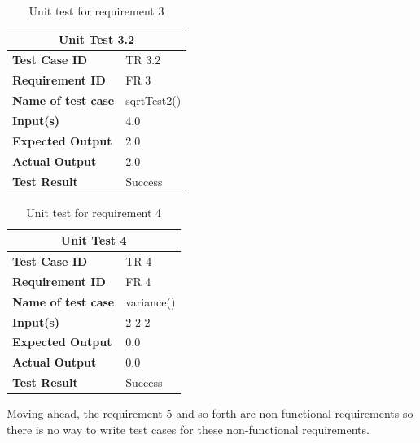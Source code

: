 \documentclass{scrartcl}
\begin{document}
\begin{table}[H]
\begin{Large}
\begin{center}
\begin{tabular}{ | m{10em} | m{10em} | } 
  \hline
  \multicolumn{2}{|c|}{\textbf {Unit Test 3.2}} \\ 
  \hline
  \textbf{Test Case ID}  &  TR 3.2\\ 
  \hline
  \textbf{Requirement ID} &  FR 3\\
  \hline
  \textbf{Name of test case} & sqrtTest2()\\
  \hline
  \textbf{Input(s) } &  4.0 \\
  \hline
  \textbf{Expected Output } & 2.0\\
  \hline
  \textbf{Actual Output } & 2.0\\
  \hline
  \textbf{Test Result } & Success \\
 \hline
\end{tabular}
\caption{Unit test for requirement 3}
\label{table:unit test 3.2}
\end{center}
\end{Large}
\end{table}

\begin{table}[H]
\begin{Large}
\begin{center}
\begin{tabular}{ | m{10em} | m{10em} | } 
  \hline
  \multicolumn{2}{|c|}{\textbf {Unit Test 4}} \\ 
  \hline
  \textbf{Test Case ID}  &  TR 4\\ 
  \hline
  \textbf{Requirement ID} &  FR 4\\
  \hline
  \textbf{Name of test case} & variance()\\
  \hline
  \textbf{Input(s) } &  2 2 2\\
  \hline
  \textbf{Expected Output } & 0.0\\
  \hline
  \textbf{Actual Output } & 0.0\\
  \hline
  \textbf{Test Result } & Success \\
 \hline
\end{tabular}
\caption{Unit test for requirement 4}
\label{table:unit test 4}
\end{center}
\end{Large}
\end{table}

\begin{spacing}{1.5}
\begin{Large}
Moving ahead, the requirement 5 and so forth are non-functional requirements so there is no way to write test cases for these non-functional requirements.
\end{Large}
\end{spacing}
\end{document}
